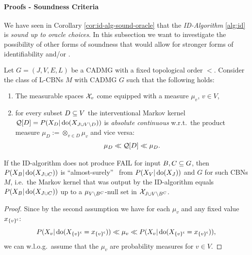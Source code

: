 \paragraph{Proofs - Soundness Criteria}


We have seen in Corollary \ref{cor:id-alg-sound-oracle} that the \emph{ID-Algorithm} \ref{alg:id} is \emph{sound up to oracle choices}.
In this subsection we want to investigate the possibility of other forms of soundness that would allow for stronger forms of identifiability and/or \trackability.






\begin{Thm}
    \label{thm:ID-as-soundness-prf}
    Let $G=(J,V,E,L)$ be a CADMG with a fixed topological order $<$. 
    Consider the class of L-CBNs $M$ with \observational CADMG $G$ such that the following holds: 
    \begin{enumerate}
        \item The measurable spaces $\mathcal{X}_v$ come equipped with a measure $\mu_v$, $v \in V$,
        \item for every subset $D \subseteq V$ the interventional Markov kernel $\mathcal{Q}[D]=P(X_D|\operatorname{do}(X_{J \cup V \setminus D}))$ is
            \emph{absolute continuous} w.r.t.\ the product measure $\mu_D:=\otimes_{v \in D} \mu_v$ and vice versa:
            \[ \mu_D \ll \mathcal{Q}[D] \ll \mu_D.   \]
    \end{enumerate}
    If the ID-algorithm does not produce FAIL for input $B, C \subseteq G$,
    then $P(X_B|\operatorname{do}(X_{J \cup C}))$ is ``almost-surely'' \trackable\ from $P(X_V|\operatorname{do}(X_J))$ and $G$ for such CBNs $M$, 
    i.e.\ the Markov kernel that was output by the ID-algorithm equals $P(X_B|\operatorname{do}(X_{J \cup C}))$ up to a
    $\mu_{V\setminus B^C}$-null set in $\mathcal{X}_{J \cup V\setminus B^C}$.
    \begin{proof}
        Since by the second assumption we have for each $\mu_v$ and any fixed value $x_{\left \{ v \right \}^{\mathsf{c}}}$:
        \[  P(X_v|\operatorname{do}(X_{\left \{ v \right \}^{\mathsf{c}}}=x_{\left \{ v \right \}^{\mathsf{c}}})) \ll \mu_v \ll P(X_v|\operatorname{do}(X_{\left \{ v \right \}^{\mathsf{c}}}=x_{\left \{ v \right \}^{\mathsf{c}}})),  \]
        we can w.l.o.g.\ assume that the $\mu_v$ are probability measures for $v \in V$.
       

\end{proof}
\end{Thm}
